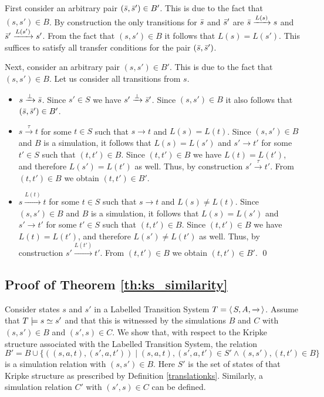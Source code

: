 \documentclass{llncs}
\newcommand{\ltstrans}[1]{\xrightarrow{#1}}
\newcommand{\kstrans}{\to}
\begin{document}
First consider an arbitrary pair $(\bar{s},\bar{s}') \in B'$. This is due to the fact that $(s,s') \in B$. By construction the only transitions for $\bar{s}$ and $\bar{s}'$ are $\shadow{s} \ltstrans{L(s)} s$ and $\shadow{s}' \ltstrans{L(s')} s'$. From the fact that $(s,s') \in B$ it follows that $L(s) = L(s')$. This suffices to satisfy all transfer conditions for the pair $(\bar{s},\bar{s}')$.

Next, consider an arbitrary pair $(s,s') \in B'$. This is due to the fact that $(s,s') \in B$. Let us consider all transitions from $s$.
\begin{itemize}
\item $s \ltstrans{\bot} \shadow{s}$. Since $s' \in S$ we have $s' \ltstrans{\bot} \shadow{s}'$. Since $(s,s') \in B$ it also follows that $(\bar{s},\bar{s}') \in B'$.

\item $s\ltstrans{\tau} t$ for some $t \in S$ such that $s \kstrans t$ and $L(s) = L(t)$.
Since $(s,s') \in B$ and $B$ is a simulation, it follows that $L(s)=L(s')$ and $s' \kstrans t'$ for some $t' \in S$ such that $(t,t') \in B$. Since $(t,t') \in B$ we have $L(t) = L(t')$, and therefore $L(s') = L(t')$ as well. Thus, by construction $s' \ltstrans{\tau} t'$. From $(t,t') \in B$ we obtain $(t,t') \in B'$.

\item $s\ltstrans{L(t)} t$ for some $t\in S$ such that $s \kstrans t$ and $L(s) \neq L(t)$.
Since $(s,s') \in B$ and $B$ is a simulation, it follows that $L(s)=L(s')$ and $s' \kstrans t'$ for some $t' \in S$ such that $(t,t') \in B$. Since $(t,t') \in B$ we have $L(t) = L(t')$, and therefore $L(s') \neq L(t')$ as well. Thus, by construction $s' \ltstrans{L(t')} t'$. From $(t,t') \in B$ we obtain $(t,t') \in B'$. \qed
\end{itemize}

\subsection{Proof of Theorem \ref{th:ks_similarity}}
\label{pf:th:ks_similarity}

Consider states $s$ and $s'$ in a Labelled Transition System $T=\tuple{
S,A,\ltstrans{}}$. Assume that $T \models s \simeq s'$ and that this
is witnessed by the simulations $B$ and $C$ with $(s,s') \in B$
and $(s',s)\in C$. We show that, with respect to the Kripke structure
associated with the Labelled Transition System, the relation $B' = B \cup
\{ ((s,a,t),(s',a,t')) \mid (s,a,t),(s',a,t') \in S' \land (s,s'),(t,t')
\in B \}$ is a simulation relation with $(s,s') \in B$. Here $S'$ is
the set of states of that Kripke structure as prescribed by Definition
\ref{translationks}. Similarly, a simulation relation $C'$ with $(s',s)
\in C$ can be defined.
\end{document}
